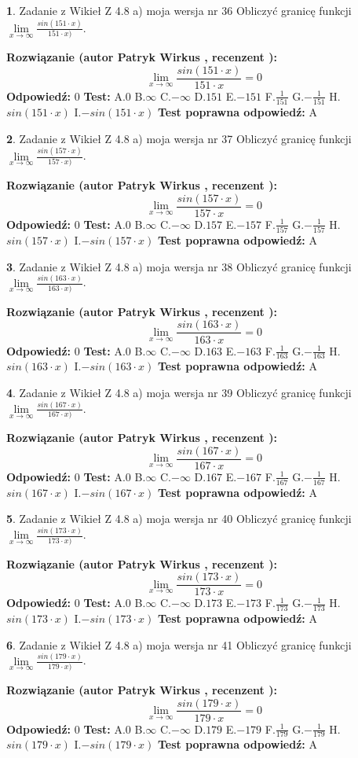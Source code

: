 \documentclass[12pt, a4paper]{article}
\theoremstyle{definition} %
\newtheorem{zad}{}
\newcommand{\zadStart}[1]{\begin{zad}#1\newline}
\newcommand{\zadStop}{\end{zad}}
\newcommand{\rozwStart}[2]{\noindent \textbf{Rozwiązanie (autor #1 , recenzent #2): }\newline}
\newcommand{\rozwStop}{\newline}
\newcommand{\odpStart}{\noindent \textbf{Odpowiedź:}\newline}
\newcommand{\odpStop}{\newline}
\newcommand{\testStart}{\noindent \textbf{Test:}\newline}
\newcommand{\testStop}{\newline}
\newcommand{\kluczStart}{\noindent \textbf{Test poprawna odpowiedź:}\newline}
\newcommand{\kluczStop}{\newline}
\begin{document}
\zadStart{Zadanie z Wikieł Z 4.8 a) moja wersja nr 36}
Obliczyć granicę funkcji $\lim\limits_{x\to \infty}\frac{sin(151\cdot x)}{151\cdot x)}$.
\zadStop
\rozwStart{Patryk Wirkus}{}
$$\lim\limits_{x\to \infty}\frac{sin(151\cdot x)}{151\cdot x}=
0$$
\rozwStop
\odpStart
$0$
\odpStop
\testStart
A.$0$ B.$\infty$ C.$-\infty$ D.$151$ E.$-151$
F.$\frac{1}{151}$ G.$-\frac{1}{151}$
H.$sin(151\cdot x)$
I.$-sin(151\cdot x)$
\testStop
\kluczStart
A
\kluczStop



\zadStart{Zadanie z Wikieł Z 4.8 a) moja wersja nr 37}
Obliczyć granicę funkcji $\lim\limits_{x\to \infty}\frac{sin(157\cdot x)}{157\cdot x)}$.
\zadStop
\rozwStart{Patryk Wirkus}{}
$$\lim\limits_{x\to \infty}\frac{sin(157\cdot x)}{157\cdot x}=
0$$
\rozwStop
\odpStart
$0$
\odpStop
\testStart
A.$0$ B.$\infty$ C.$-\infty$ D.$157$ E.$-157$
F.$\frac{1}{157}$ G.$-\frac{1}{157}$
H.$sin(157\cdot x)$
I.$-sin(157\cdot x)$
\testStop
\kluczStart
A
\kluczStop



\zadStart{Zadanie z Wikieł Z 4.8 a) moja wersja nr 38}
Obliczyć granicę funkcji $\lim\limits_{x\to \infty}\frac{sin(163\cdot x)}{163\cdot x)}$.
\zadStop
\rozwStart{Patryk Wirkus}{}
$$\lim\limits_{x\to \infty}\frac{sin(163\cdot x)}{163\cdot x}=
0$$
\rozwStop
\odpStart
$0$
\odpStop
\testStart
A.$0$ B.$\infty$ C.$-\infty$ D.$163$ E.$-163$
F.$\frac{1}{163}$ G.$-\frac{1}{163}$
H.$sin(163\cdot x)$
I.$-sin(163\cdot x)$
\testStop
\kluczStart
A
\kluczStop



\zadStart{Zadanie z Wikieł Z 4.8 a) moja wersja nr 39}
Obliczyć granicę funkcji $\lim\limits_{x\to \infty}\frac{sin(167\cdot x)}{167\cdot x)}$.
\zadStop
\rozwStart{Patryk Wirkus}{}
$$\lim\limits_{x\to \infty}\frac{sin(167\cdot x)}{167\cdot x}=
0$$
\rozwStop
\odpStart
$0$
\odpStop
\testStart
A.$0$ B.$\infty$ C.$-\infty$ D.$167$ E.$-167$
F.$\frac{1}{167}$ G.$-\frac{1}{167}$
H.$sin(167\cdot x)$
I.$-sin(167\cdot x)$
\testStop
\kluczStart
A
\kluczStop



\zadStart{Zadanie z Wikieł Z 4.8 a) moja wersja nr 40}
Obliczyć granicę funkcji $\lim\limits_{x\to \infty}\frac{sin(173\cdot x)}{173\cdot x)}$.
\zadStop
\rozwStart{Patryk Wirkus}{}
$$\lim\limits_{x\to \infty}\frac{sin(173\cdot x)}{173\cdot x}=
0$$
\rozwStop
\odpStart
$0$
\odpStop
\testStart
A.$0$ B.$\infty$ C.$-\infty$ D.$173$ E.$-173$
F.$\frac{1}{173}$ G.$-\frac{1}{173}$
H.$sin(173\cdot x)$
I.$-sin(173\cdot x)$
\testStop
\kluczStart
A
\kluczStop



\zadStart{Zadanie z Wikieł Z 4.8 a) moja wersja nr 41}
Obliczyć granicę funkcji $\lim\limits_{x\to \infty}\frac{sin(179\cdot x)}{179\cdot x)}$.
\zadStop
\rozwStart{Patryk Wirkus}{}
$$\lim\limits_{x\to \infty}\frac{sin(179\cdot x)}{179\cdot x}=
0$$
\rozwStop
\odpStart
$0$
\odpStop
\testStart
A.$0$ B.$\infty$ C.$-\infty$ D.$179$ E.$-179$
F.$\frac{1}{179}$ G.$-\frac{1}{179}$
H.$sin(179\cdot x)$
I.$-sin(179\cdot x)$
\testStop
\kluczStart
A
\kluczStop
\end{document}
